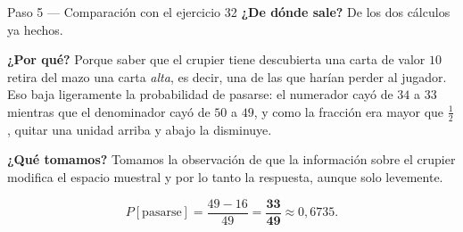 \documentclass[11pt]{article}
\begin{document}
\begin{sol}
\begin{paso}{Paso 5 --- Comparaci\'on con el ejercicio 32}
\textbf{¿De d\'onde sale?} De los dos c\'alculos ya hechos.

\textbf{¿Por qu\'e?} Porque saber que el crupier tiene descubierta una carta de valor $10$ retira del mazo una carta \emph{alta}, es decir, una de las que har\'ian perder al jugador. Eso baja ligeramente la probabilidad de pasarse: el numerador cay\'o de $34$ a $33$ mientras que el denominador cay\'o de $50$ a $49$, y como la fracci\'on era mayor que $\frac{1}{2}$, quitar una unidad arriba y abajo la disminuye.

\textbf{¿Qu\'e tomamos?} Tomamos la observaci\'on de que la informaci\'on sobre el crupier modifica el espacio muestral y por lo tanto la respuesta, aunque solo levemente.
\end{paso}

\end{sol}

\begin{resp}
\[
P[\text{pasarse}]=\frac{49-16}{49}=\mathbf{\frac{33}{49}}\approx 0{,}6735 .
\]
\end{resp}
\end{document}

